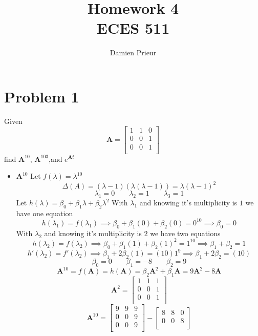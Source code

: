\documentclass{article}
\author{Damien Prieur}
\title{Homework 4 \\ ECES 511}
\date{}
\begin{document}
\maketitle

\section*{Problem 1}
Given
$$
\mathbf{A}
=
\begin{bmatrix}
1 & 1 & 0 \\
0 & 0 & 1 \\
0 & 0 & 1 \\
\end{bmatrix}
$$
find $\mathbf{A}^{10}$, $\mathbf{A}^{103}$,and $e^{\mathbf{A}t}$
\begin{itemize}
\item $\mathbf{A}^{10}$
\newline
Let $f(\lambda) = \lambda^{10}$
$$\Delta(A) = (\lambda-1)(\lambda(\lambda-1)) = \lambda(\lambda-1)^2 $$
$$ \lambda_1 = 0 \qquad \lambda_2 = 1 \qquad \lambda_3 = 1 $$
Let $h(\lambda) = \beta_0 + \beta_1\lambda + \beta_2\lambda^2$
\newline
With $\lambda_1$ and knowing it's multiplicity is $1$ we have one equation
$$ h(\lambda_1) = f(\lambda_1) \implies \beta_0 + \beta_1(0) + \beta_2(0) = 0^{10} \implies \beta_0 = 0 $$
With $\lambda_2$ and knowing it's multiplicity is $2$ we have two equations
$$ h(\lambda_2) = f(\lambda_2) \implies \beta_0 + \beta_1(1) + \beta_2(1)^2 = 1^{10} \implies \beta_1 + \beta_2 = 1 $$
$$ h'(\lambda_2) = f'(\lambda_2) \implies \beta_1 + 2\beta_2(1) = (10)1^{9} \implies \beta_1 + 2\beta_2 = (10) $$
$$ \beta_0 = 0 \qquad \beta_1 = -8 \qquad \beta_2 = 9 $$
$$ \mathbf{A}^{10} = f(\mathbf{A}) = h(\mathbf{A}) = \beta_2\mathbf{A}^2 + \beta_1\mathbf{A} = 9\mathbf{A}^2 - 8\mathbf{A} $$
$$
\mathbf{A}^2
=
\begin{bmatrix}
1 & 1 & 1 \\
0 & 0 & 1 \\
0 & 0 & 1 \\
\end{bmatrix}
$$
$$
\mathbf{A}^{10}
=
\begin{bmatrix}
9 & 9 & 9 \\
0 & 0 & 9 \\
0 & 0 & 9 \\
\end{bmatrix}
-
\begin{bmatrix}
8 & 8 & 0 \\
0 & 0 & 8 \\

\end{bmatrix}$$
\end{itemize}
\end{document}
